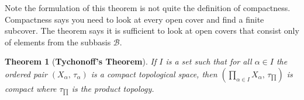 \documentclass{article}
\theoremstyle{plain}
\newtheorem{theorem}{Theorem}[section]
\begin{document}
        Note the formulation of this theorem is not quite the definition of
        compactness. Compactness says you need to look at every open cover and
        find a finite subcover. The theorem says it is sufficient to look at
        open covers that consist only of elements from the subbasis
        $\mathcal{B}$.
        \begin{theorem}[\textbf{Tychonoff's Theorem}]
            If $I$ is a set such that for all $\alpha\in{I}$ the ordered pair
            $(X_{\alpha},\,\tau_{\alpha})$ is a compact topological space,
            then $(\prod_{\alpha\in{I}}X_{\alpha},\,\tau_{\prod})$ is
            compact where $\tau_{\prod}$ is the product topology.
        \end{theorem}
\end{document}
